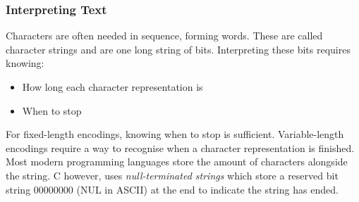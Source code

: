 \documentclass{article}
\begin{document}
\subsubsection{Interpreting Text}
Characters are often needed in sequence, forming words.
These are called character strings and are one long string of bits.
Interpreting these bits requires knowing:
\begin{itemize}
    \item How long each character representation is
    \item When to stop
\end{itemize}
For fixed-length encodings, knowing when to stop is sufficient.
Variable-length encodings require a way to recognise when a character representation is finished.
Most modern programming languages store the amount of characters alongside the string.
C however, uses \emph{null-terminated strings} which store a reserved bit string 00000000 (NUL in ASCII)
at the end to indicate the string has ended.
\end{document}
